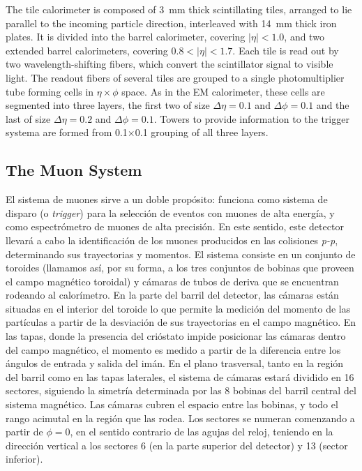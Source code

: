 The tile calorimeter is composed of 3~mm thick scintillating tiles, arranged to lie parallel  to the incoming particle direction, interleaved with 14~mm thick iron plates. %
It is divided into the barrel calorimeter, covering $|\eta|<1.0$, and two extended barrel calorimeters, covering  $0.8 < |\eta| <1.7$. Each tile is read out by two wavelength-shifting fibers, which convert the scintillator signal to visible light. The readout fibers of several tiles are grouped to a single photomultiplier tube forming cells in $\eta \times \phi$ space. As in the EM calorimeter, these cells are segmented into three layers, the first two of size $\Delta \eta = 0.1$ and  $\Delta \phi = 0.1$ and the last of size   $\Delta \eta = 0.2$ and  $\Delta \phi = 0.1$.  Towers to provide information to the trigger systema are formed from 0.1$\times$0.1 grouping of all three layers.



\subsection{The Muon System}\label{sec:atlasCALO}
 El sistema de muones sirve a un doble prop\'osito: funciona como sistema de disparo (o \emph{trigger}) para la selecci\'on de eventos con muones de alta energ\'ia, y como espectr\'ometro de muones de alta precisi\'on. En este sentido, este detector llevar\'a a cabo la identificaci\'on de los muones producidos en las colisiones \emph{p-p}, determinando sus trayectorias y momentos.
   El sistema consiste en un conjunto de toroides (llamamos as\'i, por su forma, a los tres conjuntos de bobinas que proveen el campo magn\'etico toroidal) y c\'amaras de tubos de deriva que se encuentran rodeando al calor\'imetro. En la parte del barril del detector, las c\'amaras est\'an situadas en el interior del toroide lo que permite la medici\'on del momento de las part\'iculas a partir de la desviaci\'on de sus trayectorias en el campo magn\'etico. En las tapas, donde la presencia del cri\'ostato impide posicionar las c\'amaras dentro del campo magn\'etico, el momento es medido a partir de la diferencia entre los \'angulos de entrada y salida del im\'an.
En el plano trasversal, tanto en la regi\'on del barril como en las tapas laterales, el sistema de c\'amaras estar\'a dividido en 16 sectores, siguiendo la simetr\'ia determinada por las 8 bobinas del barril central del sistema magn\'etico. Las c\'amaras cubren el espacio entre las bobinas, y todo el rango acimutal en la regi\'on que las rodea. Los sectores se numeran comenzando a partir de $\phi = 0$, en el sentido contrario de las agujas del reloj, teniendo en la direcci\'on vertical a los sectores 6 (en la parte superior del detector) y 13 (sector inferior).  

